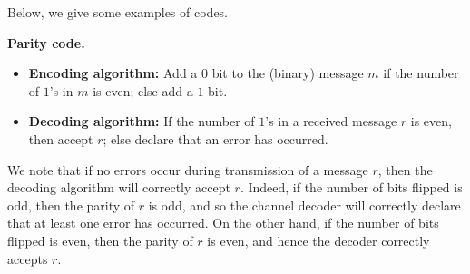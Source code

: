 \documentclass[10pt]{article}
\theoremstyle{newstyle}
\begin{document}
\begin{center}
\end{center}

Below, we give some examples of codes.

{\bf Parity code.}
\begin{itemize}
    \item {\bf Encoding algorithm:} Add a $0$ bit to the (binary) message $m$ if the number of 
    $1$'s in $m$ is even; else add a $1$ bit.
    \item {\bf Decoding algorithm:} If the number of $1$'s in a received message $r$ is even, 
    then accept $r$; else declare that an error has occurred.
\end{itemize}
We note that if no errors occur during transmission of a message $r$, then the decoding 
algorithm will correctly accept $r$. Indeed, if the number of bits flipped is odd, then 
the parity of $r$ is odd, and so the channel decoder will correctly declare that 
at least one error has occurred. On the other hand, if the number of bits flipped 
is even, then the parity of $r$ is even, and hence the decoder correctly accepts $r$.
\end{document}
